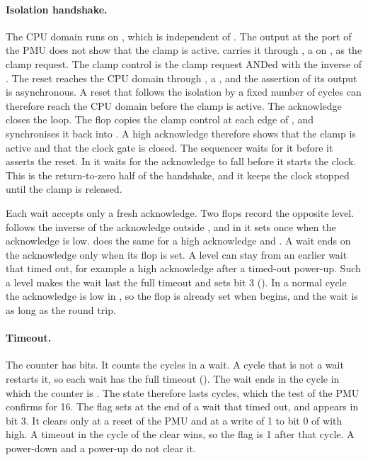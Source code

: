 \paragraph{Isolation handshake.} The CPU domain runs on , which is independent of . The output  at the port of the PMU does not show that the clamp is active.  carries it through , a  on , as the clamp request. The clamp control  is the clamp request ANDed with the inverse of . The reset  reaches the CPU domain through , a , and the assertion of its output is asynchronous. A reset that follows the isolation by a fixed number of cycles can therefore reach the CPU domain before the clamp is active. The acknowledge closes the loop. The flop  copies the clamp control at each edge of , and  synchronises it back into . A high acknowledge therefore shows that the clamp is active and that the clock gate is closed. The sequencer waits for it before it asserts the reset. In  it waits for the acknowledge to fall before it starts the clock. This is the return-to-zero half of the handshake, and it keeps the clock stopped until the clamp is released.

Each wait accepts only a fresh acknowledge. Two flops record the opposite level.  follows the inverse of the acknowledge outside , and in  it sets once when the acknowledge is low.  does the same for a high acknowledge and . A wait ends on the acknowledge only when its flop is set. A level can stay from an earlier wait that timed out, for example a high acknowledge after a timed-out power-up. Such a level makes the wait last the full timeout and sets  bit 3 (). In a normal cycle the acknowledge is low in , so the flop is already set when  begins, and the wait is as long as the round trip.

\paragraph{Timeout.} The counter  has  bits. It counts the cycles in a wait. A cycle that is not a wait restarts it, so each wait has the full timeout (). The wait ends in the cycle in which the counter is . The state therefore lasts  cycles, which the test of the PMU confirms for 16. The flag  sets at the end of a wait that timed out, and appears in  bit 3. It clears only at a reset of the PMU and at a write of 1 to bit 0 of  with  high. A timeout in the cycle of the clear wins, so the flag is 1 after that cycle. A power-down and a power-up do not clear it.

